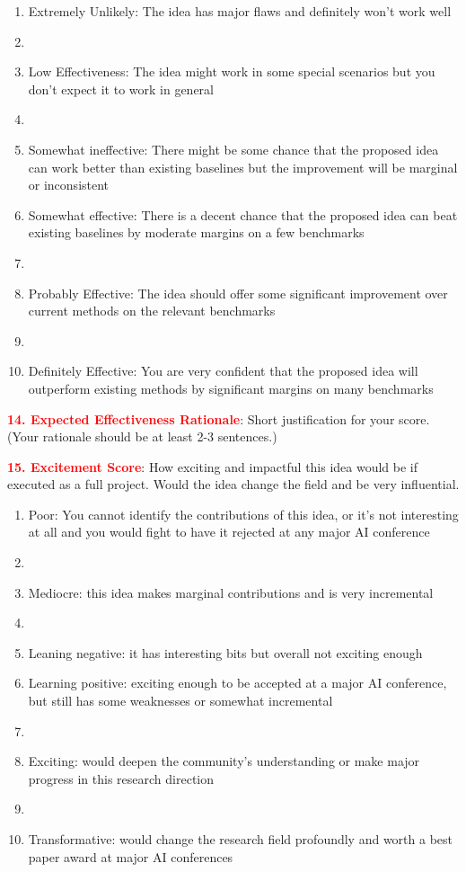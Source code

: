 \begin{enumerate}
    \item Extremely Unlikely: The idea has major flaws and definitely won't work well
    \item 
    \item Low Effectiveness: The idea might work in some special scenarios but you don't expect it to work in general
    \item 
    \item Somewhat ineffective: There might be some chance that the proposed idea can work better than existing baselines but the improvement will be marginal or inconsistent
    \item Somewhat effective: There is a decent chance that the proposed idea can beat existing baselines by moderate margins on a few benchmarks
    \item 
    \item Probably Effective: The idea should offer some significant improvement over current methods on the relevant benchmarks
    \item 
    \item Definitely Effective: You are very confident that the proposed idea will outperform existing methods by significant margins on many benchmarks
\end{enumerate}

\textbf{\textcolor{red}{14. Expected Effectiveness Rationale}}: Short justification for your score. (Your rationale should be at least 2-3 sentences.)



\textbf{\textcolor{red}{15. Excitement Score}}: How exciting and impactful this idea would be if executed as a full project. Would the idea change the field and be very influential.

\begin{enumerate}
    \item Poor: You cannot identify the contributions of this idea, or it's not interesting at all and you would fight to have it rejected at any major AI conference
    \item 
    \item Mediocre: this idea makes marginal contributions and is very incremental
    \item 
    \item Leaning negative: it has interesting bits but overall not exciting enough
    \item Learning positive: exciting enough to be accepted at a major AI conference, but still has some weaknesses or somewhat incremental
    \item 
    \item Exciting: would deepen the community's understanding or make major progress in this research direction
    \item 
    \item Transformative: would change the research field profoundly and worth a best paper award at major AI conferences
\end{enumerate}

